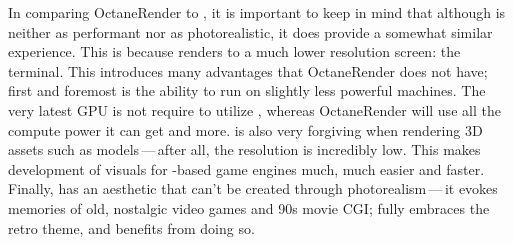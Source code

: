 In comparing OctaneRender to \name{}, it is important to keep in mind that although \name{} is neither as performant nor as photorealistic, it does provide a somewhat similar experience.
This is because \name{} renders to a much lower resolution screen: the terminal.
This introduces many advantages that OctaneRender does not have; first and foremost is the ability to run on slightly less powerful machines.
The very latest GPU is not require to utilize \name{}, whereas OctaneRender will use all the compute power it can get and more.
 \name{} is also very forgiving when rendering 3D assets such as models\,---\,after all, the resolution is incredibly low.
This makes development of visuals for \name{}-based game engines much, much easier and faster.
Finally, \name{} has an aesthetic that can't be created through photorealism\,---\,it evokes memories of old, nostalgic video games and 90s movie CGI; \name{} fully embraces the retro theme, and benefits from doing so.
